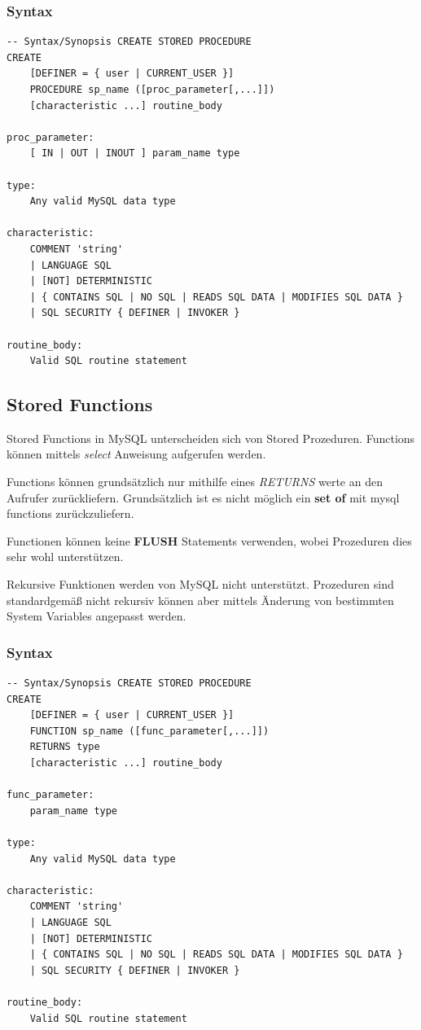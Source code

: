 \clearpage
\subsubsection{Syntax}
\begin{lstlisting}[style=sql1]
-- Syntax/Synopsis CREATE STORED PROCEDURE
CREATE
	[DEFINER = { user | CURRENT_USER }]
	PROCEDURE sp_name ([proc_parameter[,...]])
	[characteristic ...] routine_body

proc_parameter:
	[ IN | OUT | INOUT ] param_name type
	
type:
	Any valid MySQL data type

characteristic:
	COMMENT 'string'
	| LANGUAGE SQL
	| [NOT] DETERMINISTIC
	| { CONTAINS SQL | NO SQL | READS SQL DATA | MODIFIES SQL DATA }
	| SQL SECURITY { DEFINER | INVOKER }

routine_body:
	Valid SQL routine statement
\end{lstlisting}

\subsection{Stored Functions}
Stored Functions in MySQL unterscheiden sich von Stored Prozeduren.
Functions können mittels \textit{select} Anweisung aufgerufen werden.

Functions können grundsätzlich nur mithilfe eines \textit{RETURNS} werte an den Aufrufer zurückliefern.
Grundsätzlich ist es nicht möglich ein \textbf{set of} mit mysql functions zurückzuliefern.

Functionen können keine \textbf{FLUSH} Statements verwenden, wobei Prozeduren dies sehr wohl unterstützen.

Rekursive Funktionen werden von MySQL nicht unterstützt. Prozeduren sind standardgemäß nicht rekursiv können aber mittels Änderung von bestimmten System Variables angepasst werden.
\clearpage
\subsubsection{Syntax}
\begin{lstlisting}[style=sql1]
-- Syntax/Synopsis CREATE STORED PROCEDURE
CREATE
	[DEFINER = { user | CURRENT_USER }]
	FUNCTION sp_name ([func_parameter[,...]])
	RETURNS type
	[characteristic ...] routine_body

func_parameter:
	param_name type

type:
	Any valid MySQL data type

characteristic:
	COMMENT 'string'
	| LANGUAGE SQL
	| [NOT] DETERMINISTIC
	| { CONTAINS SQL | NO SQL | READS SQL DATA | MODIFIES SQL DATA }
	| SQL SECURITY { DEFINER | INVOKER }

routine_body:
	Valid SQL routine statement
\end{lstlisting}


